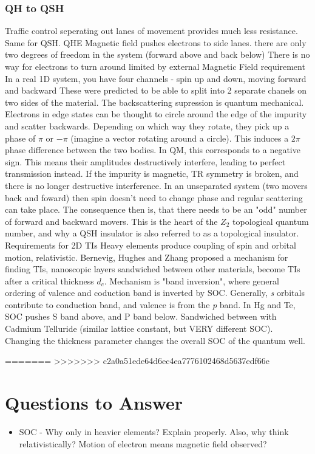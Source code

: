 \documentclass{article} %
\begin{document}
	\subsubsection{QH to QSH}
	\begin{outline}
	\1 Traffic control seperating out lanes of movement provides much less resistance. Same for QSH.
	\1 QHE Magnetic field pushes electrons to side lanes.
		\2 there are only two degrees of freedom in the system (forward above and back below)
		\2 There is no way for electrons to turn around
		\2 limited by external Magnetic Field requirement
	\1 In a real 1D system, you have four channels - spin up and down, moving forward and backward
		\2 These were predicted to be able to split into 2 separate chanels on two sides of the material. 
	\1 The backscattering supression is quantum mechanical.
		\2 Electrons in edge states can be thought to circle around the edge of the impurity and scatter backwards.
		\2 Depending on which way they rotate, they pick up a phase of $\pi$ or $-\pi$ (imagine a vector rotating around a circle). 
		\2 This induces a $2\pi$ phase difference between the two bodies. 
		\2 In QM, this corresponds to a negative sign. This means their amplitudes destructively interfere, leading to perfect transmission instead.
		\2 If the impurity is magnetic, TR symmetry is broken, and there is no longer destructive interference.
		\2 In an unseparated system (two movers back and foward) then spin doesn't need to change phase and regular scattering can take place.
		\2 The consequence then is, that there needs to be an "odd" number of forward and backward movers.
		\2 This is the heart of the $Z_2$ topological quantum number, and why a QSH insulator is also referred to as a topological insulator.
	\1 Requirements for 2D TIs
		\2 Heavy elements produce coupling of spin and orbital motion, relativistic.
	\1 Bernevig, Hughes and Zhang proposed a mechanism for finding TIs, nanoscopic layers sandwiched between other materials, become TIs after a critical thickness $d_c$. 
		\2 Mechanism is "band inversion", where general ordering of valence and coduction band is inverted by SOC.
		\2 Generally, \textit{s} orbitals contribute to conduction band, and valence is from the \textit{p} band.
		\2 In Hg and Te, SOC pushes S band above, and P band below.
		\2 Sandwiched between with Cadmium Telluride (similar lattice constant, but VERY different SOC).
		\2 Changing the thickness parameter changes the overall SOC of the quantum well. 
		
	
=======
>>>>>>> c2a0a51ede64d6ec4ea7776102468d5637edf66e
	\end{outline}


\section{Questions to Answer}
	\begin{itemize}
		\item SOC - Why only in heavier elements? Explain properly. Also, why think relativistically? Motion of electron means magnetic field observed?
	\end{itemize}



\end{document}
